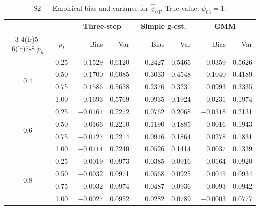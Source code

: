 \documentclass[12pt]{article}
\begin{document}
\begin{table}[htbp]
\centering
\caption{S2 --- Empirical bias and variance for $\hat\psi_{03}$.
         True value: $\psi_{03}=1$.}
\label{tab:s2_psi03}
\small
\begin{tabular}{cc rr rr rr}
\toprule
& & \multicolumn{2}{c}{Three-step} & \multicolumn{2}{c}{Simple g-est.} & \multicolumn{2}{c}{GMM} \\
\cmidrule(lr){3-4}\cmidrule(lr){5-6}\cmidrule(lr){7-8}
$p_h$ & $p_I$ & Bias & Var & Bias & Var & Bias & Var \\
\midrule
\multirow{4}{*}{0.4}
 & 0.25 & $\phantom{-}0.1529$ & 0.6120 & $\phantom{-}0.2427$ & 0.5465 & $\phantom{-}0.0359$ & 0.5626 \\
 & 0.50 & $\phantom{-}0.1700$ & 0.6085 & $\phantom{-}0.3033$ & 0.4548 & $\phantom{-}0.1040$ & 0.4189 \\
 & 0.75 & $\phantom{-}0.1586$ & 0.5658 & $\phantom{-}0.2376$ & 0.3231 & $\phantom{-}0.0993$ & 0.3335 \\
 & 1.00 & $\phantom{-}0.1693$ & 0.5769 & $\phantom{-}0.0935$ & 0.1924 & $\phantom{-}0.0231$ & 0.1974 \\
\midrule
\multirow{4}{*}{0.6}
 & 0.25 & $-0.0161$ & 0.2272 & $\phantom{-}0.0762$ & 0.2068 & $-0.0318$ & 0.2131 \\
 & 0.50 & $-0.0166$ & 0.2210 & $\phantom{-}0.1190$ & 0.1885 & $-0.0016$ & 0.1943 \\
 & 0.75 & $-0.0127$ & 0.2214 & $\phantom{-}0.0916$ & 0.1864 & $\phantom{-}0.0278$ & 0.1831 \\
 & 1.00 & $-0.0114$ & 0.2240 & $\phantom{-}0.0526$ & 0.1414 & $\phantom{-}0.0037$ & 0.1339 \\
\midrule
\multirow{4}{*}{0.8}
 & 0.25 & $-0.0019$ & 0.0973 & $\phantom{-}0.0385$ & 0.0916 & $-0.0164$ & 0.0920 \\
 & 0.50 & $-0.0032$ & 0.0971 & $\phantom{-}0.0568$ & 0.0925 & $\phantom{-}0.0045$ & 0.0934 \\
 & 0.75 & $-0.0032$ & 0.0974 & $\phantom{-}0.0487$ & 0.0936 & $\phantom{-}0.0093$ & 0.0942 \\
 & 1.00 & $-0.0027$ & 0.0952 & $\phantom{-}0.0282$ & 0.0789 & $-0.0003$ & 0.0777 \\
\bottomrule
\end{tabular}
\end{table}
\end{document}
